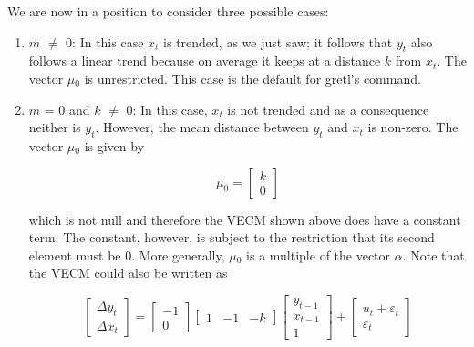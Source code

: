       We are now in a position to consider three possible cases:
    
\begin{enumerate}
\item 
	  $m$ $\ne$ 0: In this case $x_t$ is trended, as we
	  just saw; it follows that $y_t$ also follows a linear trend because on
	  average it keeps at a distance $k$ from $x_t$. The
	  vector $\mu$\ensuremath{_{0}} is unrestricted.  This case is
	  the default for gretl's  command.
	
\item 
	  $m$ = 0 and $k$ $\ne$ 0: 
	  In this case, $x_t$ is not trended and as a
	  consequence neither is $y_t$. However, the mean distance between $y_t$
	  and $x_t$ is non-zero. The vector $\mu$\ensuremath{_{0}} is given by
	  
\renewcommand{\arraystretch}{1.3}
\setlength{\arraycolsep}{.05in}
	      \[
	      \mu_0 = \left[  \begin{array}{c} k \\ 0 \end{array} \right]
	      \]
	    
	  which is not null and therefore the VECM shown above
	  does have a constant term. The constant, however, is subject to the
	  restriction that its second element must be 0. More generally,
	  $\mu$\ensuremath{_{0}} is a multiple of the vector $\alpha$. Note that the VECM
	  could also be written as
	  
\renewcommand{\arraystretch}{1.3}
\setlength{\arraycolsep}{.05in}
   \[
     \left[  \begin{array}{c} \Delta y_t \\ \Delta x_t \end{array} \right]  =  
     \left[  \begin{array}{r} -1 \\ 0 \end{array} \right]
     \left[  \begin{array}{rrr} 1 & -1 & -k \end{array} \right] 
     \left[  \begin{array}{c} y_{t-1} \\ x_{t-1} \\ 1 \end{array} \right] + 
     \left[  \begin{array}{c} u_t + \varepsilon_t \\ \varepsilon_t  \end{array} \right]
   \]
	   

\end{enumerate}
